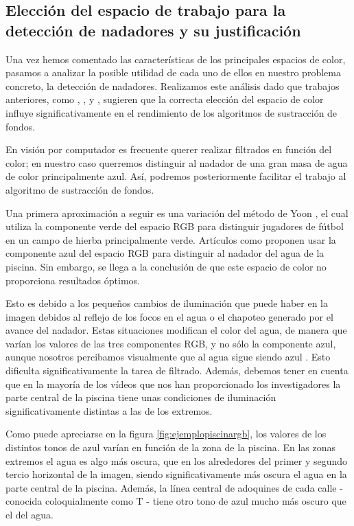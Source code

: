 \subsection{Elección del espacio de trabajo para la detección de nadadores y su justificación} \label{sub:elegirespaciocolor}

Una vez hemos comentado las características de los principales espacios de color, pasamos a analizar la posible utilidad de cada uno de ellos en nuestro problema concreto, la detección de nadadores. Realizamos este análisis dado que trabajos anteriores, como \cite{hsvforswimmerdetection}, \cite{swimmerartii}, \cite{footbalhsv} y \cite{swimmerdetectorii}, sugieren que la correcta elección del espacio de color influye significativamente en el rendimiento de los algoritmos de sustracción de fondos. 

En visión por computador es frecuente querer realizar filtrados en función del color; en nuestro caso querremos distinguir al nadador de una gran masa de agua de color principalmente azul. Así, podremos posteriormente facilitar el trabajo al algoritmo de sustracción de fondos.

Una primera aproximación a seguir es una variación del método de Yoon \cite{yoonmethod}, el cual utiliza la componente verde del espacio RGB para distinguir jugadores de fútbol en un campo de hierba principalmente verde. Artículos como \cite{swimmerartii} proponen usar la componente azul del espacio RGB para distinguir al nadador del agua de la piscina. Sin embargo, se llega a la conclusión de que este espacio de color no proporciona resultados óptimos. 

Esto es debido a los pequeños cambios de iluminación que puede haber en la imagen debidos al reflejo de los focos en el agua o el chapoteo generado por el avance del nadador. Estas situaciones modifican el color del agua, de manera que varían los valores de las tres componentes RGB, y no sólo la  componente azul, aunque nosotros percibamos visualmente que al agua sigue siendo azul \cite{swimmerartii}. Esto dificulta significativamente la tarea de filtrado. Además, debemos tener en cuenta que en la mayoría de los vídeos que nos han proporcionado los investigadores la parte central de la piscina tiene unas condiciones de iluminación significativamente distintas a las de los extremos. 

Como puede apreciarse en la figura \ref{fig:ejemplopiscinargb}, los valores de los distintos tonos de azul varían en función de la zona de la piscina. En las zonas extremos el agua es algo más oscura, que en los alrededores del primer y segundo tercio horizontal de la imagen, siendo significativamente más oscura el agua en la parte central de la piscina. Además, la línea central de adoquines de cada calle - conocida coloquialmente como T - tiene otro tono de azul mucho más oscuro que el del agua.

